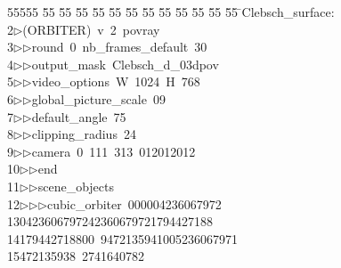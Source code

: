 %
%
\begin{tabbing}
55555 \= 55 \= 55 \= 55 \= 55 \= 55 \= 55 \= 55 \= 55 \= 55 \= 55 \= 55 \= 55 \= \>Clebsch\_surface:\\[0pt]
2\>$\triangleright$\>(ORBITER)\ v\ 2\ povray\ \\[0pt]
3\>$\triangleright$\>$\triangleright$\>round\ 0\ nb\_frames\_default\ 30\ \\[0pt]
4\>$\triangleright$\>$\triangleright$\>output\_mask\ Clebsch\_d\_03dpov\ \\[0pt]
5\>$\triangleright$\>$\triangleright$\>video\_options\ W\ 1024\ H\ 768\ \\[0pt]
6\>$\triangleright$\>$\triangleright$\>global\_picture\_scale\ 09\ \\[0pt]
7\>$\triangleright$\>$\triangleright$\>default\_angle\ 75\ \\[0pt]
8\>$\triangleright$\>$\triangleright$\>clipping\_radius\ 24\ \\[0pt]
9\>$\triangleright$\>$\triangleright$\>camera\ 0\ 111\ 313\ 012012012\ \\[0pt]
10\>$\triangleright$\>$\triangleright$\>end\ \\[0pt]
11\>$\triangleright$\>$\triangleright$\>scene\_objects\ \\[0pt]
12\>$\triangleright$\>$\triangleright$\>$\triangleright$\>cubic\_orbiter\ 000004236067972\\[0pt]
130423606797242360679721794427188\\[0pt]
14\>179442718800\ 9472135941005236067971\\[0pt]
15472135938\ 2741640782\ \\[0pt]

\end{tabbing}
